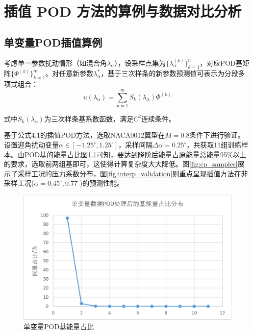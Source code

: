 \chapter{插值 POD 方法的算例与数据对比分析}
\label{cha:usage-example}

\section{单变量POD插值算例}
\label{sec:single_variable_pod}
考虑单一参数扰动情形（如混合角$\lambda_\alpha$），设采样点集为$\{\lambda_{\alpha}^{(k)}\}_{k=1}^n$，对应POD基矩阵$\{\Phi^{(k)}\}_{k=1}^m$。对任意新参数$\lambda_\alpha^*$，基于三次样条的新参数预测值可表示为分段多项式组合：
 \begin{equation}
    u(\lambda_\alpha) = \sum_{k=1}^{m} S_k(\lambda_\alpha) \Phi^{(k)}
\end{equation}

式中$S_k(\lambda_\alpha)$为三次样条基系数函数，满足$C^2$连续条件。

基于公式4.1的插值POD方法，选取NACA0012翼型在$M=0.8$条件下进行验证。设置迎角扰动变量$\alpha\in[-1.25^\circ,1.25^\circ]$，采样间隔$\Delta\alpha=0.25^\circ$，共获取11组训练样本。由POD基的能量占比图\ref{fig_result}可知，要达到降阶后能量占原能量总能量95\%以上的要求，选取前两组基即可，这使得计算复杂度大大降低。图\ref{fig:cp_samples}展示了采样工况的压力系数分布，图\ref{fig:interp_validation}则重点呈现插值方法在非采样工况($\alpha=0.45^\circ,0.77^\circ$)的预测性能。

\begin{figure}[H]
    \centering
    \includegraphics[width=1.0\linewidth]{单变量能量占比.png}
    \caption{\songti 单变量POD基能量占比\\}
    \label{fig_result}
\end{figure}

